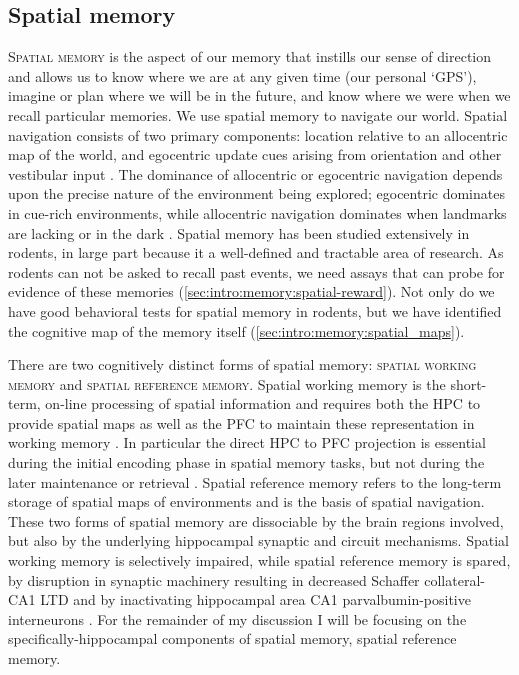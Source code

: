 \subsection{Spatial memory}
\label{sec:intro:memory:spatial}
\textsc{Spatial memory} is the aspect of our memory that instills our sense of direction and allows us to know where we are at any given time (our personal `GPS'), imagine or plan where we will be in the future, and know where we were when we recall particular memories.
We use spatial memory to navigate our world.
Spatial navigation consists of two primary components: location relative to an allocentric map of the world, and egocentric update cues arising from orientation and other vestibular input \citep{Sanders2015}.
The dominance of allocentric or egocentric navigation depends upon the precise nature of the environment being explored; egocentric dominates in cue-rich environments, while allocentric navigation dominates when landmarks are lacking or in the dark \citep{Knierim1998, Markus1994}.
Spatial memory has been studied extensively in rodents, in large part because it a well-defined and tractable area of research.
As rodents can not be asked to recall past events, we need assays that can probe for evidence of these memories (\autoref{sec:intro:memory:spatial-reward}).
Not only do we have good behavioral tests for spatial memory in rodents, but we have identified the cognitive map of the memory itself (\autoref{sec:intro:memory:spatial_maps}).

There are two cognitively distinct forms of spatial memory: \textsc{spatial working memory} and \textsc{spatial reference memory}.
Spatial working memory is the short-term, on-line processing of spatial information and requires both the \ac{HPC} to provide spatial maps \citep{Morris1982} as well as the \ac{PFC} to maintain these representation in working memory \citep{Olton1979}.
In particular the direct \ac{HPC} to \ac{PFC} projection is essential during the initial encoding phase in spatial memory tasks, but not during the later maintenance or retrieval \citep{Spellman2015}.
Spatial reference memory refers to the long-term storage of spatial maps of environments and is the basis of spatial navigation.
These two forms of spatial memory are dissociable by the brain regions involved, but also by the underlying hippocampal synaptic and circuit mechanisms.
Spatial working memory is selectively impaired, while spatial reference memory is spared, by disruption in synaptic machinery resulting in decreased Schaffer collateral-CA1 LTD \citep{Zeng2001} and by inactivating hippocampal area CA1 parvalbumin-positive interneurons \citep{Murray2011}.
For the remainder of my discussion I will be focusing on the specifically-hippocampal components of spatial memory, spatial reference memory.

